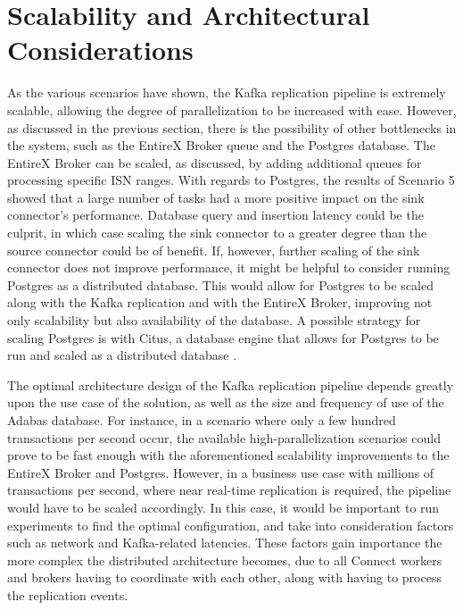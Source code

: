\section{Scalability and Architectural Considerations}
As the various scenarios have shown, the Kafka replication pipeline is extremely scalable, allowing the degree of parallelization to be increased with ease. However, as discussed in the previous section, there is the possibility of other bottlenecks in the system, such as the EntireX Broker queue and the Postgres database. The EntireX Broker can be scaled, as discussed, by adding additional queues for processing specific \ac{ISN} ranges. With regards to Postgres, the results of Scenario 5 showed that a large number of tasks had a more positive impact on the sink connector's performance. Database query and insertion latency could be the culprit, in which case scaling the sink connector to a greater degree than the source connector could be of benefit. If, however, further scaling of the sink connector does not improve performance, it might be helpful to consider running Postgres as a distributed database. This would allow for Postgres to be scaled along with the Kafka replication and with the EntireX Broker, improving not only scalability but also availability of the database. A possible strategy for scaling Postgres is with Citus, a database engine that allows for Postgres to be run and scaled as a distributed database \cite{cubukcu2021citus}.

The optimal architecture design of the Kafka replication pipeline depends greatly upon the use case of the solution, as well as the size and frequency of use of the Adabas database. For instance, in a scenario where only a few hundred transactions per second occur, the available high-parallelization scenarios could prove to be fast enough with the aforementioned scalability improvements to the EntireX Broker and Postgres. However, in a business use case with millions of transactions per second, where near real-time replication is required, the pipeline would have to be scaled accordingly. In this case, it would be important to run experiments to find the optimal configuration, and take into consideration factors such as network and Kafka-related latencies. These factors gain importance the more complex the distributed architecture becomes, due to all Connect workers and brokers having to coordinate with each other, along with having to process the replication events.

